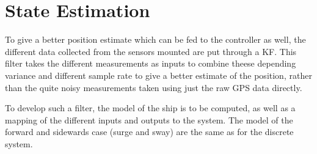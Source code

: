\chapter{State Estimation}
To give a better position estimate which can be fed to the controller as well, the different data collected from the sensors mounted are put through a \ac{KF}. This filter takes the different measurements as inputs to combine theese depending variance and different sample rate to give a better estimate of the position, rather than the quite noisy measurements taken using just the raw \ac{GPS} data directly.

To develop such a filter, the model of the ship is to be computed, as well as a mapping of the different inputs and outputs to the system. The model of the forward and sidewards case (surge and sway) are the same as for the discrete system.

